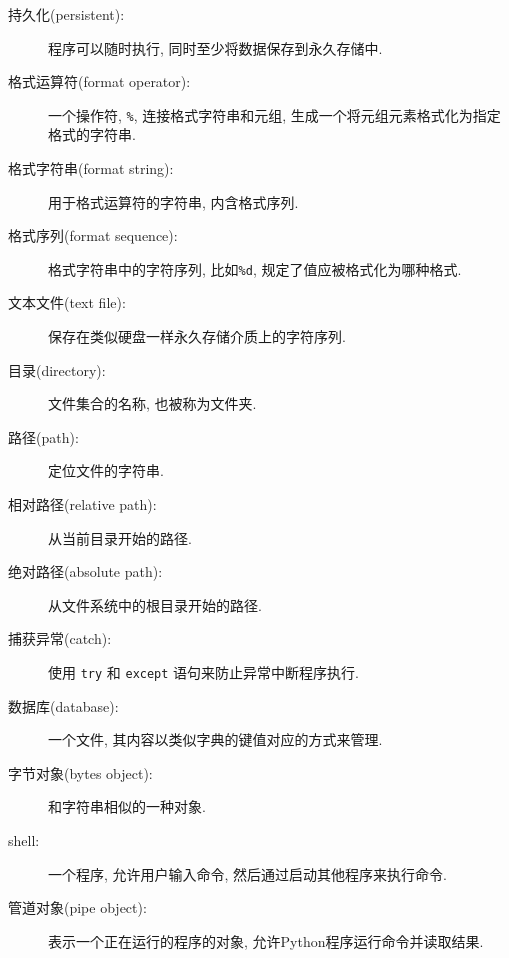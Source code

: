 \documentclass[10pt]{book}
\begin{document}
\begin{description}

\item[持久化(persistent):] 程序可以随时执行, 同时至少将数据保存到永久存储中. 

\item[格式运算符(format operator):] 一个操作符, {\tt \%}, 连接格式字符串和元组, 
生成一个将元组元素格式化为指定格式的字符串. 

\item[格式字符串(format string):] 用于格式运算符的字符串, 内含格式序列.  

\item[格式序列(format sequence):] 格式字符串中的字符序列, 
比如{\tt \%d}, 规定了值应被格式化为哪种格式.

\item[文本文件(text file):] 保存在类似硬盘一样永久存储介质上的字符序列. 

\item[目录(directory):] 文件集合的名称, 也被称为文件夹.

\item[路径(path):] 定位文件的字符串. 

\item[相对路径(relative path):] 从当前目录开始的路径. 

\item[绝对路径(absolute path):] 从文件系统中的根目录开始的路径. 

\item[捕获异常(catch):] 使用 {\tt try} 和 {\tt except} 语句来防止异常中断程序执行. 

\item[数据库(database):] 一个文件, 其内容以类似字典的键值对应的方式来管理. 

\item[字节对象(bytes object):] 和字符串相似的一种对象.

\item[shell:] 一个程序, 允许用户输入命令, 然后通过启动其他程序来执行命令. 

\item[管道对象(pipe object):] 表示一个正在运行的程序的对象, 
允许Python程序运行命令并读取结果.

\end{description}
\end{document}
